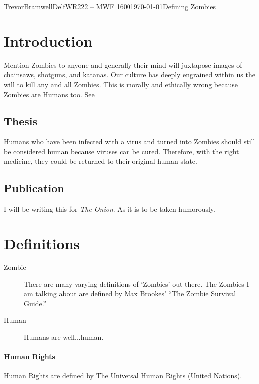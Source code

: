 \documentclass[12pt,letterpaper]{article}
\begin{document}
\begin{mla}{Trevor}{Bramwell}{Delf}{WR222 -- MWF 1600}{\today}{Defining Zombies}

\section*{Introduction}
Mention Zombies to anyone and generally their mind will juxtapose images of
chainsaws, shotguns, and katanas. Our culture has deeply engrained within us
the will to kill any and all Zombies. This is morally and ethically wrong
because Zombies are Humans too. See 

\subsection*{Thesis}\label{sec:thesis}
Humans who have been infected with a virus and turned into Zombies should
still be considered human because viruses can be cured. Therefore, with the
right medicine, they could be returned to their original human state.

\subsection*{Publication}
I will be writing this for \emph{The Onion}. As it is to be taken humorously.

\section*{Definitions}
    \begin{description}
        \item[Zombie]{There are many varying definitions of `Zombies' out there. The Zombies I am
        talking about are defined by Max Brookes' ``The Zombie Survival Guide.''}
        \item[Human]{Humans are well...human.}
    \end{description}



\paragraph{Human Rights}
Human Rights are defined by The Universal Human Rights (United Nations).



\end{mla}
\end{document}
